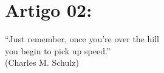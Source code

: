 \chapter{Artigo 02:}
\label{cap:paper_02}

\begin{flushright}
    ``Just remember, 
    once you're over the hill\\
     you begin to pick up speed.''\\
    (Charles M. Schulz)
    \end{flushright}
